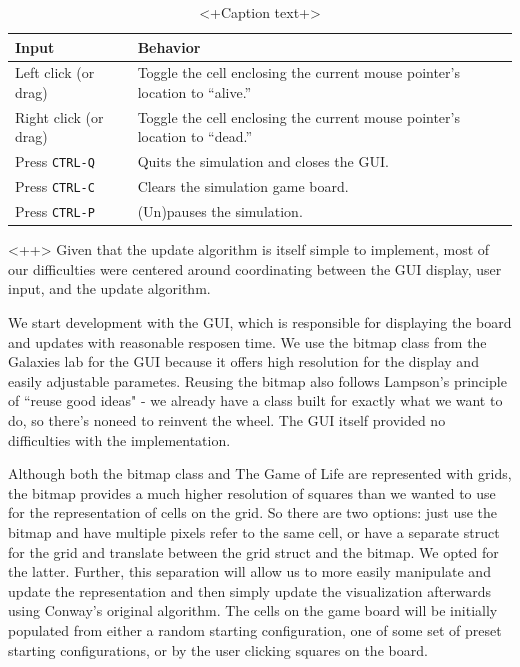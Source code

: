 \documentclass[onecolumn,12pt]{IEEEtran}
\begin{document}
  \begin{table}
    \centering
    \begin{tabular}{lp{10cm}} \toprule
      Input & Behavior \\ \midrule
      Left click (or drag) & Toggle the cell enclosing the current mouse
      pointer's location to ``alive.'' \\
      Right click (or drag) & Toggle the cell enclosing the current mouse
      pointer's location to ``dead.'' \\
      Press \texttt{CTRL-Q} & Quits the simulation and closes the GUI. \\
      Press \texttt{CTRL-C} & Clears the simulation game board. \\
      Press \texttt{CTRL-P} & (Un)pauses the simulation. \\
    \end{tabular}
    \caption{<+Caption text+>}
    \label{tab:<+label+>}
  \end{table}<++>
  Given that the update algorithm is itself simple to implement, most of our
  difficulties were centered around coordinating between the GUI display, user
  input, and the update algorithm.	

  We start development with the GUI, which is responsible for displaying the
  board and updates with reasonable resposen time. We use the bitmap class from
  the Galaxies lab for the GUI because it offers high resolution for the display
  and easily adjustable parametes. Reusing the bitmap also follows Lampson's
  principle of ``reuse good ideas" - we already have a class built for exactly
  what we want to do, so there's noneed to reinvent the wheel. The GUI itself
  provided no difficulties with the implementation. 

  Although both the bitmap class and The Game of Life are represented with grids,
  the bitmap provides a much higher resolution of squares than we wanted to use
  for the representation of cells on the grid. So there are two options: just use
  the bitmap and have multiple pixels refer to the same cell, or have a separate
  struct for the grid and translate between the grid struct and the bitmap. We
  opted for the latter. Further, this separation will allow us to more easily
  manipulate and update the representation and then simply update the
  visualization afterwards using Conway's original algorithm. The cells on the
  game board will be initially populated from either a random starting
  configuration, one of some set of preset starting configurations, or by the
  user clicking squares on the board. 
\end{document}
